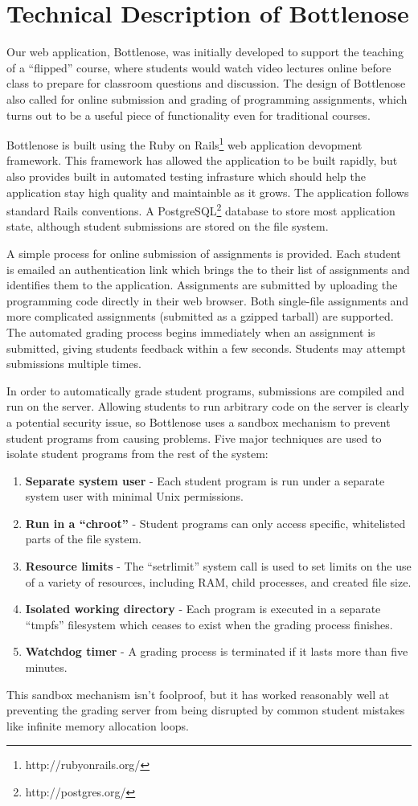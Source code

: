 \section{Technical Description of Bottlenose}

Our web application, Bottlenose, was initially developed to support
the teaching of a ``flipped'' course, where students would watch video
lectures online before class to prepare for classroom questions and
discussion. The design of Bottlenose also called for online submission
and grading of programming assignments, which turns out to be a useful
piece of functionality even for traditional courses.

Bottlenose is built using the Ruby on
Rails\footnote{http://rubyonrails.org/} web application devopment
framework. This framework has allowed the application to be built
rapidly, but also provides built in automated testing infrasture which
should help the application stay high quality and maintainble as it
grows. The application follows standard Rails conventions. A
PostgreSQL\footnote{http://postgres.org/} database to store most
application state, although student submissions are stored on the file
system.

A simple process for online submission of assignments is
provided. Each student is emailed an authentication link which brings
the to their list of assignments and identifies them to the
application. Assignments are submitted by uploading the programming
code directly in their web browser. Both single-file assignments and
more complicated assignments (submitted as a gzipped tarball) are
supported. The automated grading process begins immediately when an
assignment is submitted, giving students feedback within a few
seconds.  Students may attempt submissions multiple times.

In order to automatically grade student programs, submissions are
compiled and run on the server. Allowing students to run arbitrary
code on the server is clearly a potential security issue, so
Bottlenose uses a sandbox mechanism to prevent student programs from
causing problems. Five major techniques are used to isolate student
programs from the rest of the system:

\begin{enumerate}
\item \textbf{Separate system user} - Each student program is run under
  a separate system user with minimal Unix permissions.
\item \textbf{Run in a ``chroot''} - Student programs can only access
  specific, whitelisted parts of the file system.
\item \textbf{Resource limits} - The ``setrlimit'' system call is used to
  set limits on the use of a variety of resources, including RAM, child
  processes, and created file size.
\item \textbf{Isolated working directory} - Each program is executed in
  a separate ``tmpfs'' filesystem which ceases to exist when the grading
  process finishes.
\item \textbf{Watchdog timer} - A grading process is terminated if it lasts
  more than five minutes.
\end{enumerate}

This sandbox mechanism isn't foolproof, but it has worked reasonably
well at preventing the grading server from being disrupted by common
student mistakes like infinite memory allocation loops.
